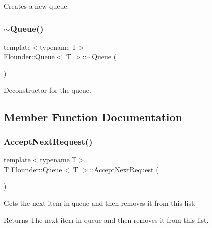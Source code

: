 Creates a new queue. 

\mbox{\label{class_flounder_1_1_queue_a99c55f9408aec360fd57ce69182f4f5e}} 
\subsubsection{\texorpdfstring{$\sim$\+Queue()}{~Queue()}}
{\footnotesize\ttfamily template$<$typename T$>$ \\
\hyperlink{class_flounder_1_1_queue}{Flounder\+::\+Queue}$<$ T $>$\+::$\sim$\hyperlink{class_flounder_1_1_queue}{Queue} (\begin{DoxyParamCaption}{ }\end{DoxyParamCaption})\hspace{0.3cm}{\ttfamily [inline]}}



Deconstructor for the queue. 



\subsection{Member Function Documentation}
\mbox{\label{class_flounder_1_1_queue_a7bf75416f7fee75190cc05b7fa82599e}} 
\subsubsection{\texorpdfstring{Accept\+Next\+Request()}{AcceptNextRequest()}}
{\footnotesize\ttfamily template$<$typename T$>$ \\
T \hyperlink{class_flounder_1_1_queue}{Flounder\+::\+Queue}$<$ T $>$\+::Accept\+Next\+Request (\begin{DoxyParamCaption}{ }\end{DoxyParamCaption})\hspace{0.3cm}{\ttfamily [inline]}}



Gets the next item in queue and then removes it from this list. 

\begin{DoxyReturn}{Returns}
The next item in queue and then removes it from this list. 
\end{DoxyReturn}
\mbox{\label{class_flounder_1_1_queue_afbfef3392c917799a7fb36e355319e62}} 
